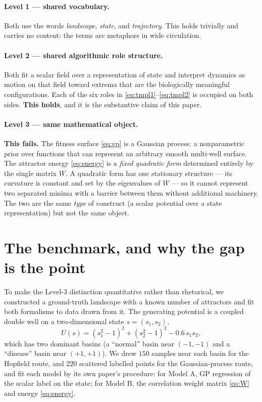 \documentclass[11pt]{article}
\begin{document}
\paragraph{Level 1 --- shared vocabulary.} Both use the words \emph{landscape}, \emph{state}, and
\emph{trajectory}. This holds trivially and carries no content: the terms are metaphors in wide circulation.

\paragraph{Level 2 --- shared algorithmic role structure.} Both fit a scalar field over a representation of state
and interpret dynamics as motion on that field toward extrema that are the biologically meaningful configurations.
Each of the six roles in \eqref{eq:tmpl1}--\eqref{eq:tmpl2} is occupied on both sides. \textbf{This holds}, and it is
the substantive claim of this paper.

\paragraph{Level 3 --- same mathematical object.} \textbf{This fails.} The fitness surface \eqref{eq:gp} is a
Gaussian process: a nonparametric prior over functions that can represent an arbitrary smooth multi-well surface.
The attractor energy \eqref{eq:energy} is a \emph{fixed quadratic form} determined entirely by the single matrix $W$.
A quadratic form has one stationary structure --- its curvature is constant and set by the eigenvalues of $W$ --- so
it cannot represent two separated minima with a barrier between them without additional machinery. The two are the
same \emph{type} of construct (a scalar potential over a state representation) but not the same object.

\section{The benchmark, and why the gap is the point}

To make the Level-3 distinction quantitative rather than rhetorical, we constructed a ground-truth landscape with a
known number of attractors and fit both formalisms to data drawn from it. The generating potential is a coupled
double well on a two-dimensional state $s=(s_1,s_2)$,
\begin{equation}
U(s) = (s_1^2-1)^2 + (s_2^2-1)^2 - 0.6\,s_1 s_2 ,
\label{eq:doublewell}
\end{equation}
which has two dominant basins (a ``normal'' basin near $(-1,-1)$ and a ``disease'' basin near $(+1,+1)$).
We drew $150$ samples near each basin for the Hopfield route, and $220$ scattered labelled points for the
Gaussian-process route, and fit each model by its own paper's procedure: for Model A, GP regression of the scalar
label on the state; for Model B, the correlation weight matrix \eqref{eq:W} and energy \eqref{eq:energy}.
\end{document}

